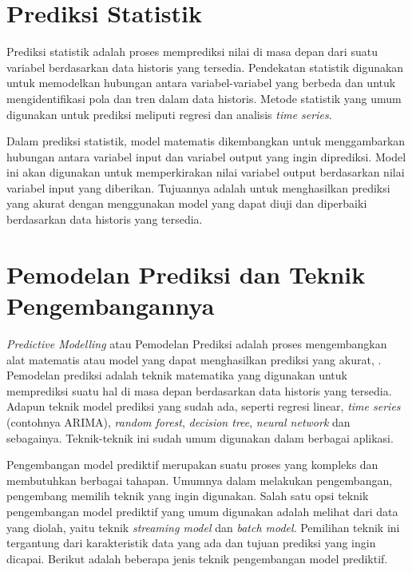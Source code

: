 \section{Prediksi Statistik}
Prediksi statistik adalah proses memprediksi nilai di masa depan dari suatu variabel berdasarkan data historis yang tersedia. Pendekatan statistik digunakan untuk memodelkan hubungan antara variabel-variabel yang berbeda dan untuk mengidentifikasi pola dan tren dalam data historis. Metode statistik yang umum digunakan untuk prediksi meliputi regresi dan analisis \textit{time series}.

Dalam prediksi statistik, model matematis dikembangkan untuk menggambarkan hubungan antara variabel input dan variabel output yang ingin diprediksi. Model ini akan digunakan untuk memperkirakan nilai variabel output berdasarkan nilai variabel input yang diberikan. Tujuannya adalah untuk menghasilkan prediksi yang akurat dengan menggunakan model yang dapat diuji dan diperbaiki berdasarkan data historis yang tersedia.

\section{Pemodelan Prediksi dan Teknik Pengembangannya}

\textit{Predictive Modelling} atau Pemodelan Prediksi adalah proses mengembangkan alat matematis atau model yang dapat menghasilkan prediksi yang akurat, \parencite{appliedpredictivemodel}. Pemodelan prediksi adalah teknik matematika yang digunakan untuk memprediksi suatu hal di masa depan berdasarkan data historis yang tersedia. 
Adapun teknik model prediksi yang sudah ada, seperti regresi linear, \textit{time series} (contohnya ARIMA), \textit{random forest}, \textit{decision tree}, \textit{neural network} dan sebagainya. Teknik-teknik ini sudah umum digunakan dalam berbagai aplikasi.

Pengembangan model prediktif merupakan suatu proses yang kompleks dan membutuhkan berbagai tahapan. Umumnya dalam melakukan pengembangan, pengembang memilih teknik yang ingin digunakan. Salah satu opsi teknik pengembangan model prediktif yang umum digunakan adalah melihat dari data yang diolah, yaitu teknik \textit{streaming model} dan \textit{batch model}. Pemilihan teknik ini tergantung dari karakteristik data yang ada dan tujuan prediksi yang ingin dicapai. Berikut adalah beberapa jenis teknik pengembangan model prediktif.

